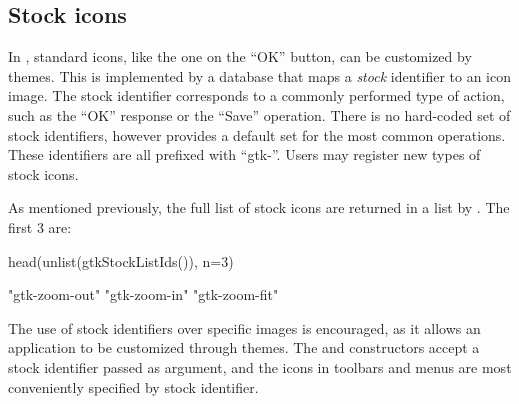 \subsection{Stock icons}
\label{sec:RGtk2:stock-icons}

In \GTK\/, standard icons, like the one on the ``OK'' button, can be
customized by themes. This is implemented by a database that maps a
\textit{stock} identifier to an icon image. The stock identifier
corresponds to a commonly performed type of action, such as the ``OK''
response or the ``Save'' operation. There is no hard-coded set of
stock identifiers, however \GTK\/ provides a default set for the most
common operations. These identifiers are all prefixed with
``gtk-''. Users may register new types of stock icons.

As mentioned previously, the full list of stock icons are returned in
a list by . The first $3$ are:
\begin{Schunk}
\begin{Sinput}
 head(unlist(gtkStockListIds()), n=3)   
\end{Sinput}
\begin{Soutput}
[1] "gtk-zoom-out" "gtk-zoom-in"  "gtk-zoom-fit"
\end{Soutput}
\end{Schunk}

The use of stock identifiers over specific images is encouraged, as it
allows an application to be customized through themes. The
 and  constructors accept
a stock identifier passed as  argument, and the icons in
toolbars and menus are most conveniently specified by stock
identifier. 








